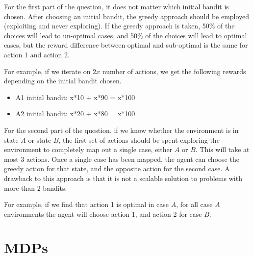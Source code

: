 \documentclass[11pt,onecolumn]{article}
\begin{document}
\begin{enumerate}
    For the first part of the question, it does not matter which initial bandit is chosen. After choosing an initial bandit, the greedy approach should be employed (exploiting and never exploring). If the greedy approach is taken, 50\% of the choices will lead to un-optimal cases, and 50\% of the choices will lead to optimal cases, but the reward difference between optimal and sub-optimal is the same for action 1 and action 2. 
    \setlength{\parskip}{6pt}
    
    For example, if we iterate on  $2x$ number of actions, we get the following rewards depending on the initial bandit chosen.
    \begin{itemize}
        \item A1 initial bandit: x*10 + x*90 = x*100
        \item A2 initial bandit: x*20 + x*80 = x*100
    \end{itemize}

    For the second part of the question, if we know whether the environment is in state $A$ or state $B$, the first set of actions should be spent exploring the environment to completely map out a single case, either $A$ or $B$. This will take at most 3 actions. Once a single case has been mapped, the agent can choose the greedy action for that state, and the opposite action for the second case. A drawback to this approach is that it is not a scalable solution to problems with more than 2 bandits.
    \setlength{\parskip}{6pt}
    
    For example, if we find that action 1 is optimal in case $A$, for all case $A$ environments the agent will choose action 1, and action 2 for case $B$.

\end{enumerate}



\section{MDPs}
\end{document}

